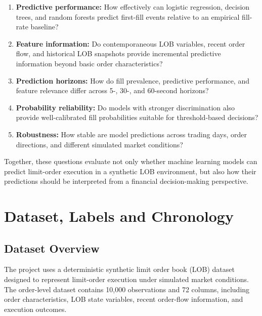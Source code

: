 \documentclass[11pt,a4paper]{article}
\begin{document}
\begin{enumerate}[leftmargin=*]
	
	\item \textbf{Predictive performance:}
	How effectively can logistic regression, decision trees,
	and random forests predict first-fill events relative
	to an empirical fill-rate baseline?
	
	\item \textbf{Feature information:}
	Do contemporaneous LOB variables, recent order flow,
	and historical LOB snapshots provide incremental
	predictive information beyond basic order characteristics?
	
	\item \textbf{Prediction horizons:}
	How do fill prevalence, predictive performance,
	and feature relevance differ across 5-, 30-,
	and 60-second horizons?
	
	\item \textbf{Probability reliability:}
	Do models with stronger discrimination also provide
	well-calibrated fill probabilities suitable for
	threshold-based decisions?
	
	\item \textbf{Robustness:}
	How stable are model predictions across trading days,
	order directions, and different simulated market conditions?
	
\end{enumerate}

Together, these questions evaluate not only whether
machine learning models can predict limit-order execution
in a synthetic LOB environment, but also how their
predictions should be interpreted from a financial
decision-making perspective.


\section{Dataset, Labels and Chronology}

\subsection{Dataset Overview}

The project uses a deterministic synthetic limit order book
(LOB) dataset designed to represent limit-order execution
under simulated market conditions. The order-level dataset
contains 10,000 observations and 72 columns, including
order characteristics, LOB state variables, recent order-flow
information, and execution outcomes.
\end{document}

